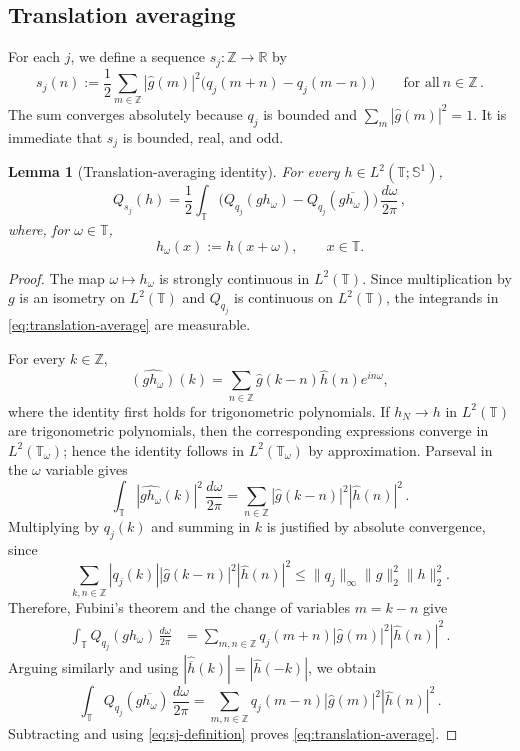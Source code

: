 \documentclass[11pt]{amsart}
\newtheorem{lemma}[theorem]{Lemma}
\theoremstyle{definition}
\theoremstyle{remark}
\newcommand{\T}{\mathbb T}
\newcommand{\Sone}{\mathbb S^1}
\newcommand{\Z}{\mathbb Z}
\newcommand{\R}{\mathbb R}
\newcommand{\wh}{\widehat}
\begin{document}

\subsection{Translation averaging}

For each $j$, we define a sequence $s_j:\Z\to\R$ by
\begin{equation}\label{eq:sj-definition}
 s_j(n):=\frac12\sum_{m\in\Z} |\wh g(m)|^2
 \big(q_j(m+n)-q_j(m-n)\big)
 \qquad\text{for all}\ n\in\Z\,.
\end{equation}
The sum converges absolutely because $q_j$ is bounded and $\sum_{m}|\wh g(m)|^2=1$.  It is immediate that $s_j$ is bounded, real, and odd.

\begin{lemma}[Translation-averaging identity]\label{lem:translation-averaging}
For every $h\in L^2(\T;\Sone)$,
\begin{equation}\label{eq:translation-average}
 Q_{s_j}(h)
 =\frac12\int_\T
 \big(Q_{q_j}(gh_\omega)-Q_{q_j}(g\overline{h_\omega})\big)\,\frac{d\omega}{2\pi} \,,
\end{equation}
where, for $\omega\in\T$,
\[
 h_\omega(x):=h(x+\omega),
 \qquad x\in\T.
\]
\end{lemma}

\begin{proof}
The map $\omega\mapsto h_\omega$ is strongly continuous in $L^2(\T)$.
Since multiplication by $g$ is an isometry on $L^2(\T)$ and
$Q_{q_j}$ is continuous on $L^2(\T)$, the integrands in
\eqref{eq:translation-average} are measurable.

For every $k\in\Z$,
\[
 \wh{(gh_\omega)}(k)
 =\sum_{n\in\Z}\wh g(k-n)\wh h(n)e^{in\omega},
\]
where the identity first holds for trigonometric polynomials. If $h_N\to h$
in $L^2(\T)$ are trigonometric polynomials, then the corresponding
expressions converge in $L^2(\T_\omega)$; hence the identity follows in
$L^2(\T_\omega)$ by approximation. Parseval in the $\omega$ variable gives
\begin{equation}\label{eq:averaged-energy-product}
 \int_\T | \wh {gh_\omega}(k)|^2 \,\frac{d\omega}{2\pi}
 =\sum_{n\in\Z} |\wh g(k-n)|^2 |\wh h(n)|^2 \,.
\end{equation}
Multiplying by $q_j(k)$ and summing in $k$ is justified by absolute
convergence, since
\[
 \sum_{k,n\in\Z}|q_j(k)|
 |\wh g(k-n)|^2|\wh h(n)|^2
 \leq\|q_j\|_\infty\|g\|_2^2\|h\|_2^2.
\]
Therefore, Fubini's theorem and the change of variables $m=k-n$ give
\begin{align*}
 \int_\T Q_{q_j}(gh_\omega)\,\frac{d\omega}{2\pi}
 &=\sum_{m,n\in\Z}q_j(m+n) |\wh g(m)|^2 |\wh h(n)|^2 \,.
\end{align*}
Arguing similarly and using $|\wh{\overline h}(k)| = |\wh h(-k)|$, we obtain
\[
 \int_\T Q_{q_j}(g\overline{h_\omega})\,\frac{d\omega}{2\pi}
 =\sum_{m,n\in\Z}q_j(m-n)|\wh g(m)|^2 |\wh h(n)|^2 \,.
\]
Subtracting and using \eqref{eq:sj-definition} proves \eqref{eq:translation-average}.
\end{proof}
\end{document}
